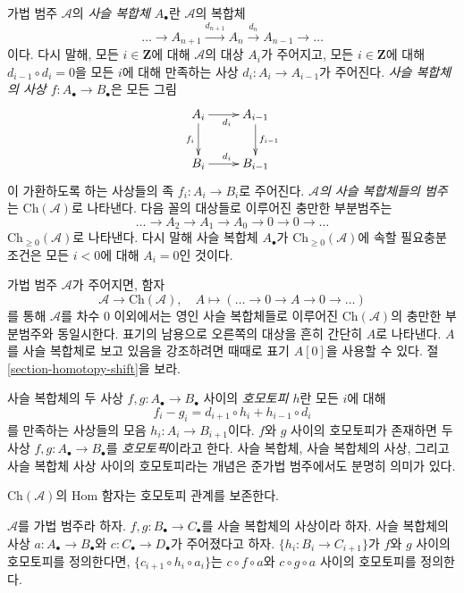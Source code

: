 \medskip\noindent
가법 범주 $\mathcal{A}$의 {\it 사슬 복합체 $A_\bullet$}란
$\mathcal{A}$의 복합체
$$
\ldots \to
A_{n + 1} \xrightarrow{d_{n + 1}}
A_n \xrightarrow{d_n}
A_{n - 1} \to
\ldots
$$
이다. 다시 말해, 모든 $i \in \mathbf{Z}$에 대해 $\mathcal{A}$의
대상 $A_i$가 주어지고, 모든 $i \in \mathbf{Z}$에 대해
$d_{i - 1} \circ d_i = 0$을 모든 $i$에 대해 만족하는 사상
$d_i : A_i \to A_{i - 1}$가 주어진다.
{\it 사슬 복합체의 사상 $f : A_\bullet \to B_\bullet$}은 모든 그림
$$
\xymatrix{
A_i \ar[r]_{d_i} \ar[d]_{f_i} & A_{i - 1} \ar[d]^{f_{i - 1}} \\
B_i \ar[r]^{d_i} & B_{i - 1}
}
$$
이 가환하도록 하는 사상들의 족 $f_i : A_i \to B_i$로 주어진다.
{\it $\mathcal{A}$의 사슬 복합체들의 범주}는
$\text{Ch}(\mathcal{A})$로 나타낸다. 다음 꼴의 대상들로 이루어진
충만한 부분범주는
$$
\ldots \to A_2 \to A_1 \to A_0 \to 0 \to 0 \to \ldots
$$
$\text{Ch}_{\geq 0}(\mathcal{A})$로 나타낸다.
다시 말해 사슬 복합체 $A_\bullet$가
$\text{Ch}_{\geq 0}(\mathcal{A})$에 속할 필요충분조건은 모든
$i < 0$에 대해 $A_i = 0$인 것이다.

\medskip\noindent
가법 범주 $\mathcal{A}$가 주어지면, 함자
$$
\mathcal{A} \longrightarrow \text{Ch}(\mathcal{A}),\quad
A \longmapsto (\ldots \to 0 \to A \to 0 \to \ldots)
$$
를 통해 $\mathcal{A}$를 차수 $0$ 이외에서는 영인 사슬 복합체들로
이루어진 $\text{Ch}(\mathcal{A})$의 충만한 부분범주와 동일시한다.
표기의 남용으로 오른쪽의 대상을 흔히 간단히 $A$로 나타낸다.
$A$를 사슬 복합체로 보고 있음을 강조하려면 때때로 표기 $A[0]$을
사용할 수 있다. 절 \ref{section-homotopy-shift}을 보라.

\medskip\noindent
사슬 복합체의 두 사상 $f, g : A_\bullet \to B_\bullet$ 사이의
{\it 호모토피 $h$}란 모든 $i$에 대해
$$
f_i - g_i = d_{i + 1} \circ h_i + h_{i - 1} \circ d_i
$$
를 만족하는 사상들의 모음 $h_i : A_i \to B_{i + 1}$이다.
$f$와 $g$ 사이의 호모토피가 존재하면 두 사상
$f, g : A_\bullet \to B_\bullet$를 {\it 호모토픽}이라고 한다.
사슬 복합체, 사슬 복합체의 사상, 그리고 사슬 복합체 사상 사이의
호모토피라는 개념은 준가법 범주에서도 분명히 의미가 있다.

\begin{lemma}
\label{lemma-compose-homotopy}
\begin{slogan}
$\text{Ch}(\mathcal{A})$의 Hom 함자는 호모토피 관계를 보존한다.
\end{slogan}
$\mathcal{A}$를 가법 범주라 하자.
$f, g : B_\bullet \to C_\bullet$를 사슬 복합체의 사상이라 하자.
사슬 복합체의 사상 $a : A_\bullet \to B_\bullet$와
$c : C_\bullet \to D_\bullet$가 주어졌다고 하자.
$\{h_i : B_i \to C_{i + 1}\}$가 $f$와 $g$ 사이의 호모토피를
정의한다면, $\{c_{i + 1} \circ h_i \circ a_i\}$는
$c \circ f \circ a$와 $c \circ g \circ a$ 사이의 호모토피를
정의한다.
\end{lemma}

